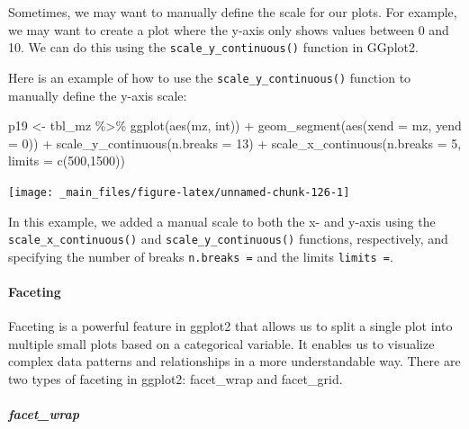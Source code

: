 \documentclass[
]{book}
\newenvironment{Shaded}{\begin{snugshade}}{\end{snugshade}}
\newcommand{\AttributeTok}[1]{\textcolor[rgb]{0.77,0.63,0.00}{#1}}
\newcommand{\DecValTok}[1]{\textcolor[rgb]{0.00,0.00,0.81}{#1}}
\newcommand{\FunctionTok}[1]{\textcolor[rgb]{0.00,0.00,0.00}{#1}}
\newcommand{\NormalTok}[1]{#1}
\newcommand{\OtherTok}[1]{\textcolor[rgb]{0.56,0.35,0.01}{#1}}
\newcommand{\SpecialCharTok}[1]{\textcolor[rgb]{0.00,0.00,0.00}{#1}}
\begin{document}
Sometimes, we may want to manually define the scale for our plots. For example, we may want to create a plot where the y-axis only shows values between 0 and 10. We can do this using the \texttt{scale\_y\_continuous()} function in GGplot2.

Here is an example of how to use the \texttt{scale\_y\_continuous()} function to manually define the y-axis scale:

\begin{Shaded}
\begin{Highlighting}[]
\NormalTok{p19 }\OtherTok{\textless{}{-}}\NormalTok{ tbl\_mz }\SpecialCharTok{\%\textgreater{}\%} 
  \FunctionTok{ggplot}\NormalTok{(}\FunctionTok{aes}\NormalTok{(mz, int)) }\SpecialCharTok{+} 
  \FunctionTok{geom\_segment}\NormalTok{(}\FunctionTok{aes}\NormalTok{(}\AttributeTok{xend =}\NormalTok{ mz, }\AttributeTok{yend =} \DecValTok{0}\NormalTok{)) }\SpecialCharTok{+}
  \FunctionTok{scale\_y\_continuous}\NormalTok{(}\AttributeTok{n.breaks =} \DecValTok{13}\NormalTok{) }\SpecialCharTok{+}
  \FunctionTok{scale\_x\_continuous}\NormalTok{(}\AttributeTok{n.breaks =} \DecValTok{5}\NormalTok{, }\AttributeTok{limits =} \FunctionTok{c}\NormalTok{(}\DecValTok{500}\NormalTok{,}\DecValTok{1500}\NormalTok{))}
\end{Highlighting}
\end{Shaded}

\begin{center}\texttt{[image: \_main\_files/figure-latex/unnamed-chunk-126-1]} \end{center}

In this example, we added a manual scale to both the x- and y-axis using the \texttt{scale\_x\_continuous()} and \texttt{scale\_y\_continuous()} functions, respectively, and specifying the number of breaks \texttt{n.breaks\ =} and the limits \texttt{limits\ =}.

\hypertarget{faceting}{%
\paragraph*{Faceting}\label{faceting}}

Faceting is a powerful feature in ggplot2 that allows us to split a single plot into multiple small plots based on a categorical variable. It enables us to visualize complex data patterns and relationships in a more understandable way. There are two types of faceting in ggplot2: facet\_wrap and facet\_grid.

\hypertarget{facet_wrap}{%
\subparagraph*{facet\_wrap}\label{facet_wrap}}
\end{document}
